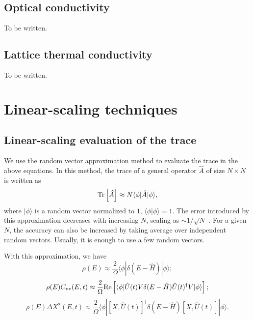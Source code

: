 \documentclass[12pt,a4paper]{report}
\begin{document}
\subsection{Optical conductivity}

To be written.

\subsection{Lattice thermal conductivity}

To be written.

\section{Linear-scaling techniques\label{section:numerical}}

\subsection{Linear-scaling evaluation of the trace}

We use the random vector approximation method \cite{weisse2006rmp} to evaluate the trace in the above equations. In this method, the trace of a general operator $\hat{A}$ of size $N\times N$ is written as
\begin{equation}
 \textmd{Tr}\left[ \hat{A} \right] \approx N \langle \phi | \hat{A} |\phi \rangle,
\end{equation}
where $|\phi\rangle$ is a random vector normalized to $1$, $\langle \phi | \phi \rangle = 1$. The error introduced by this approximation decreases with increasing $N$, scaling as $\sim 1/\sqrt{N}$ \cite{weisse2006rmp}. For a given $N$, the accuracy can also be increased by taking average over independent random vectors. Usually, it is enough to use a few random vectors.

With this approximation, we have
\begin{equation}
\label{equation:trace_DOS}
 \rho(E) \approx \frac{2}{\Omega} \langle \phi | \delta(E - \hat{H}) |\phi \rangle;
\end{equation}
\begin{equation}
\label{equation:trace_VAC}
 \rho (E) C_{vv}(E, t) \approx
 \frac{2}{\Omega} \textmd{Re}
 \left[ \langle\phi|\hat{U}(t)V \delta(E - \hat{H}) \hat{U}(t)^{\dagger}V|\phi \rangle \right];
\end{equation}
\begin{equation}
\label{equation:trace_MSD}
 \rho (E) \Delta X^2(E, t) \approx
 \frac{2}{\Omega}
 \langle\phi|[X, \hat{U}(t)]^{\dagger} \delta(E - \hat{H})[X, \hat{U}(t)]|\phi \rangle.
\end{equation}
\end{document}
